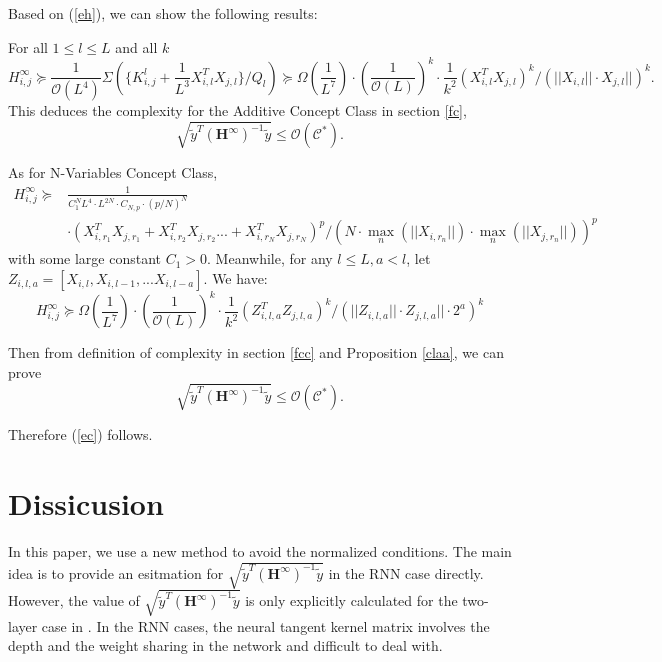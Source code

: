 \documentclass{article}
\newcommand{\cO}{\mathcal{O}}
\begin{document}
Based on (\ref{eh}), we can show  the following results:

 For all $1\leq l\leq L$ and all $k$
\begin{equation}
H^{\infty}_{i,j}\succeq \frac{1}{\cO(L^4)} \Sigma(\{K^{l}_{i,j}+\frac{1}{L^3}X_{i,l}^TX_{j,l}\}/Q_{l})\succeq  \Omega( \frac{1}{L^7}) \cdot (\frac{1}{\cO(L)})^{k}\cdot \frac{1}{k^2} (X_{i,l}^TX_{j,l})^{k}/(||X_{i,l}||\cdot X_{j,l}||)^{k}.
\end{equation}
This deduces the complexity for the Additive Concept Class in section \ref{fc},
\begin{equation}
\sqrt{\widetilde{y}^T (\bm{H}^{\infty})^{-1}\widetilde{y}}\leq \cO(\mathscr{C}^*).
\end{equation}

As for N-Variables Concept Class,
\begin{equation}
\begin{aligned}
H^\infty_{i,j}\succeq&  \frac{1}{C_1^N L^4 \cdot L^{2N} \cdot C_{N,p}\cdot(p/N)^N}\\
&\cdot (X_{i,r_1}^TX_{j,r_1} +X_{i,r_2}^TX_{j,r_2}... + X_{i,r_N}^TX_{j,r_N})^p/(N\cdot \max_n(||X_{i,r_n}||)\cdot \max_n(||X_{j,r_n}||)) ^{p}
\end{aligned}
\end{equation}
with some large constant $C_1>0$. Meanwhile, for any $l\leq L, a<l$, let $Z_{i, l,a}= [X_{i,l}, X_{i,l-1},... X_{i,l-a}] $. We have:
\begin{equation}
H^\infty_{i,j}\succeq \Omega( \frac{1}{L^7}) \cdot (\frac{1}{\cO(L)})^{k}\cdot \frac{1}{k^2} (Z_{i,l,a}^TZ_{j,l,a})^{k}/(||Z_{i,l,a}||\cdot Z_{j,l,a}||\cdot 2^a)^{k}
\end{equation}

Then from definition of complexity in section \ref{fcc} and Proposition \ref{claa}, we can prove
\begin{equation}
\sqrt{\widetilde{y}^T (\bm{H}^{\infty})^{-1}\widetilde{y}}\leq \cO(\mathscr{C}^*).
\end{equation}


Therefore (\ref{ec}) follows.
\section{Dissicusion}
In this paper, we use a new method to avoid the normalized conditions. The main idea is to provide an esitmation for $\sqrt{\widetilde{y}^T (\bm{H}^\infty)^{-1}\widetilde{y}}$ in the RNN case directly. However, the value of $\sqrt{\widetilde{y}^T (\bm{H}^\infty)^{-1}\widetilde{y}}$ is only explicitly calculated for the two-layer case in \cite{sa}. In the RNN cases, the neural tangent kernel matrix involves the depth and the weight sharing in the network and difficult to deal with.
\end{document}
